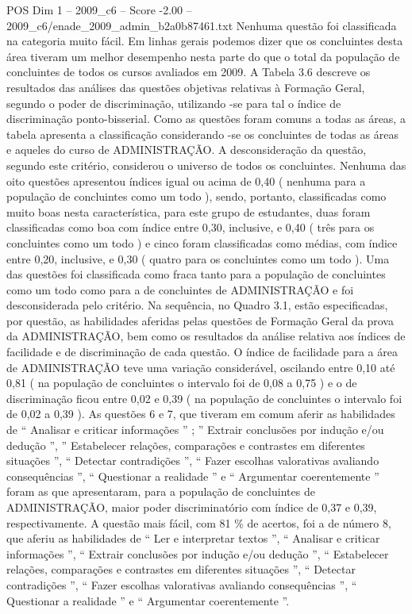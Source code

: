 \begin{textsample}{POS Dim 1 – 2009\_c6 – Score -2.00 – 2009\_c6/enade\_2009\_admin\_b2a0b87461.txt}
Nenhuma questão foi classificada na categoria muito fácil.
Em linhas gerais podemos dizer que os concluintes desta área tiveram um melhor desempenho nesta parte do que o total da população de concluintes de todos os cursos avaliados em 2009.
A Tabela 3.6 descreve os resultados das análises das questões objetivas relativas à Formação Geral, segundo o poder de discriminação, utilizando -se para tal o índice de discriminação ponto-bisserial.
Como as questões foram comuns a todas as áreas, a tabela apresenta a classificação considerando -se os concluintes de todas as áreas e aqueles do curso de ADMINISTRAÇÃO.
A desconsideração da questão, segundo este critério, considerou o universo de todos os concluintes.
Nenhuma das oito questões apresentou índices igual ou acima de 0,40 ( nenhuma para a população de concluintes como um todo ), sendo, portanto, classificadas como muito boas nesta característica, para este grupo de estudantes, duas foram classificadas como boa com índice entre 0,30, inclusive, e 0,40 ( três para os concluintes como um todo ) e cinco foram classificadas como médias, com índice entre 0,20, inclusive, e 0,30 ( quatro para os concluintes como um todo ).
Uma das questões foi classificada como fraca tanto para a população de concluintes como um todo como para a de concluintes de ADMINISTRAÇÃO e foi desconsiderada pelo critério.
Na sequência, no Quadro 3.1, estão especificadas, por questão, as habilidades aferidas pelas questões de Formação Geral da prova da ADMINISTRAÇÃO, bem como os resultados da análise relativa aos índices de facilidade e de discriminação de cada questão.
O índice de facilidade para a área de ADMINISTRAÇÃO teve uma variação considerável, oscilando entre 0,10 até 0,81 ( na população de concluintes o intervalo foi de 0,08 a 0,75 ) e o de discriminação ficou entre 0,02 e 0,39 ( na população de concluintes o intervalo foi de 0,02 a 0,39 ).
As questões 6 e 7, que tiveram em comum aferir as habilidades de “ Analisar e criticar informações ” ; ” Extrair conclusões por indução e/ou dedução ”, ” Estabelecer relações, comparações e contrastes em diferentes situações ”, “ Detectar contradições ”, “ Fazer escolhas valorativas avaliando consequências ”, “ Questionar a realidade ” e “ Argumentar coerentemente ” foram as que apresentaram, para a população de concluintes de ADMINISTRAÇÃO, maior poder discriminatório com índice de 0,37 e 0,39, respectivamente.
A questão mais fácil, com 81 \% de acertos, foi a de número 8, que aferiu as habilidades de “ Ler e interpretar textos ”, “ Analisar e criticar informações ”, “ Extrair conclusões por indução e/ou dedução ”, “ Estabelecer relações, comparações e contrastes em diferentes situações ”, “ Detectar contradições ”, “ Fazer escolhas valorativas avaliando consequências ”, “ Questionar a realidade ” e “ Argumentar coerentemente ”.

\end{textsample}
